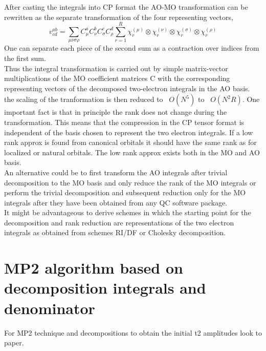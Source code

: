 \documentclass[10pt, draft]{article}
\begin{document}
After casting the integrals into CP format the AO-MO transformation can be rewritten as the separate transformation of the four representing vectors,
\[ v^{ab}_{cd} = \sum_{\mu\nu\sigma\rho} C^a_\mu C^b_\nu C^c_\sigma C^d_\rho \sum_{r=1}^R \chi_r^{(\mu)} \otimes \chi_r^{(\nu)} \otimes \chi_r^{(\sigma)} \otimes \chi_r^{(\rho)}\]
 One can separate each piece of the second sum as a contraction over indices from the first sum.\\
 Thus the integral transformation is carried out by simple matrix-vector multiplications of the MO coefficient matrices C with the corresponding representing vectors of the decomposed two-electron integrals in the AO basis.\\
 the scaling of the tranformation is then reduced to ~$O(N^5)$ to ~$O(N^2 R)$. One important fact is that in principle the rank does not change during the transformation. This means that the compression in the CP tensor format is independent of the basis chosen to represent the two electron integrals.  If a low rank approx is found from canonical orbitals it should have the same rank as for localized or natural orbitals.  The low rank approx exists both in the MO and AO basis.  \\
 An alternative could be to first transform the AO integrals after trivial decomposition to the MO basis and only reduce the rank of the MO integrals or perform the trivial decomposition and subsequent reduction only for the MO integrals after they have been obtained from any QC software package.  \\
 
 It might be advantageous to derive schemes in which the starting point for the decomposition and rank reduction are representations of the two electron integrals as obtained from schemes RI/DF or Cholesky decomposition.
 
 \section{MP2 algorithm based on decomposition integrals and denominator}
 For MP2 technique and decompositions to obtain the initial t2 amplitudes look to paper.
 
\end{document}
